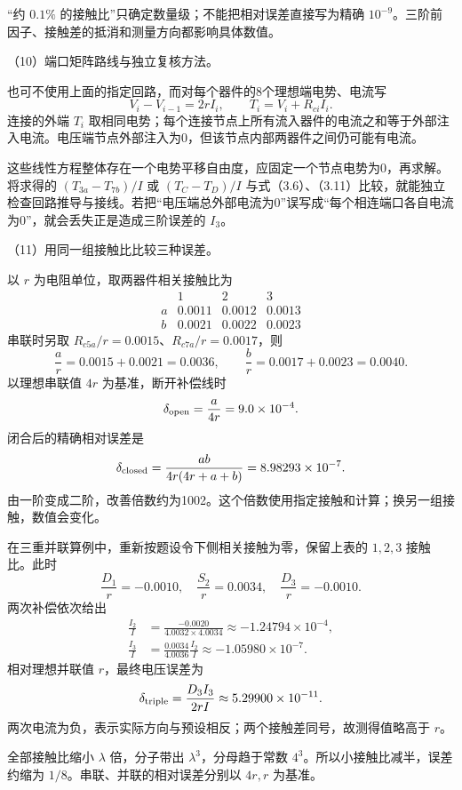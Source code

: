 \documentclass[12pt,a4paper,fontset=fandol]{ctexart}
\begin{document}
``约 \(0.1\%\) 的接触比''只确定数量级；不能把相对误差直接写为精确
\(10^{-9}\)。三阶前因子、接触差的抵消和测量方向都影响具体数值。

（10）端口矩阵路线与独立复核方法。

也可不使用上面的指定回路，而对每个器件的8个理想端电势、电流写 \[
V_i-V_{i-1}=2rI_i,\qquad T_i=V_i+R_{ci}I_i.
\] 连接的外端 \(T_i\)
取相同电势；每个连接节点上所有流入器件的电流之和等于外部注入电流。电压端节点外部注入为0，但该节点内部两器件之间仍可能有电流。

这些线性方程整体存在一个电势平移自由度，应固定一个节点电势为0，再求解。将求得的
\((T_{3a}-T_{7b})/I\) 或 \((T_C-T_D)/I\)
与式（3.6）、（3.11）比较，就能独立检查回路推导与接线。若把``电压端总外部电流为0''误写成``每个相连端口各自电流为0''，就会丢失正是造成三阶误差的
\(I_3\)。

（11）用同一组接触比比较三种误差。

以 \(r\) 为电阻单位，取两器件相关接触比为 \[
\begin{array}{c|ccc}
&1&2&3\\\hline
a&0.0011&0.0012&0.0013\\
b&0.0021&0.0022&0.0023
\end{array}
\] 串联时另取 \(R_{c5a}/r=0.0015\)、\(R_{c7a}/r=0.0017\)，则 \[
\frac ar=0.0015+0.0021=0.0036,\qquad
\frac br=0.0017+0.0023=0.0040.
\] 以理想串联值 \(4r\) 为基准，断开补偿线时 \[
\delta_{\rm open}=\frac{a}{4r}=9.0\times10^{-4}.
\] 闭合后的精确相对误差是 \[
\delta_{\rm closed}
=\frac{ab}{4r(4r+a+b)}
=8.98293\times10^{-7}.
\]
由一阶变成二阶，改善倍数约为1002。这个倍数使用指定接触和计算；换另一组接触，数值会变化。

在三重并联算例中，重新按题设令下侧相关接触为零，保留上表的 \(1,2,3\)
接触比。此时 \[
\frac{D_1}{r}=-0.0010,\quad
\frac{S_2}{r}=0.0034,\quad
\frac{D_3}{r}=-0.0010.
\] 两次补偿依次给出 \[
\begin{aligned}
\frac{I_2}{I}&=\frac{-0.0020}{4.0032\times4.0034}
\approx-1.24794\times10^{-4},\\
\frac{I_3}{I}&=\frac{0.0034}{4.0036}\frac{I_2}{I}
\approx-1.05980\times10^{-7}.
\end{aligned}
\] 相对理想并联值 \(r\)，最终电压误差为 \[
\delta_{\rm triple}
=\frac{D_3I_3}{2rI}
\approx5.29900\times10^{-11}.
\] 两次电流为负，表示实际方向与预设相反；两个接触差同号，故测得值略高于
\(r\)。

全部接触比缩小 \(\lambda\) 倍，分子带出 \(\lambda^3\)，分母趋于常数
\(4^3\)。所以小接触比减半，误差约缩为
\(1/8\)。串联、并联的相对误差分别以 \(4r,r\) 为基准。
\end{document}

